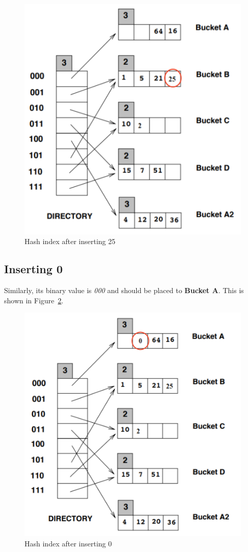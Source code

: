 \begin{figure}[H]
  \centering
  \includegraphics[width=0.9\linewidth]{figs/q2-2.png}
  \caption{Hash index after inserting 25}
  \label{fig:q2-2}
\end{figure}

\subsection{Inserting 0}

Similarly, its binary value is \textit{000} and should be placed to \textbf{Bucket A}.
This is shown in Figure~\ref{fig:q2-3}.

\begin{figure}[H]
  \centering
  \includegraphics[width=0.9\linewidth]{figs/q2-3.png}
  \caption{Hash index after inserting 0}
  \label{fig:q2-3}
\end{figure}

